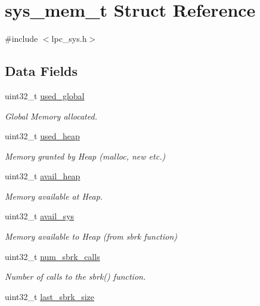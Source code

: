\hypertarget{structsys__mem__t}{}\section{sys\+\_\+mem\+\_\+t Struct Reference}
\label{structsys__mem__t}


{\ttfamily \#include $<$lpc\+\_\+sys.\+h$>$}

\subsection*{Data Fields}
\begin{DoxyCompactItemize}
\item 
uint32\+\_\+t \hyperlink{structsys__mem__t_a2a50937f3383927bd97862e45ee51cbd}{used\+\_\+global}
\begin{DoxyCompactList}\small\item\em Global Memory allocated. \end{DoxyCompactList}\item 
uint32\+\_\+t \hyperlink{structsys__mem__t_a993a5c256a5b499a37e2e8e0028412ac}{used\+\_\+heap}
\begin{DoxyCompactList}\small\item\em Memory granted by Heap (malloc, new etc.) \end{DoxyCompactList}\item 
uint32\+\_\+t \hyperlink{structsys__mem__t_a617bcd6f4de9e85e62939fe355f952aa}{avail\+\_\+heap}
\begin{DoxyCompactList}\small\item\em Memory available at Heap. \end{DoxyCompactList}\item 
uint32\+\_\+t \hyperlink{structsys__mem__t_a8ecba5ffd106ad27d5c8792c2eeb8e1b}{avail\+\_\+sys}
\begin{DoxyCompactList}\small\item\em Memory available to Heap (from sbrk function) \end{DoxyCompactList}\item 
uint32\+\_\+t \hyperlink{structsys__mem__t_a14e38b193706a5f4168d28394a19e1b8}{num\+\_\+sbrk\+\_\+calls}
\begin{DoxyCompactList}\small\item\em Number of calls to the sbrk() function. \end{DoxyCompactList}\item 
uint32\+\_\+t \hyperlink{structsys__mem__t_aede69012147cf9fb23a2133a60d3b464}{last\+\_\+sbrk\+\_\+size}

\end{DoxyCompactItemize}
